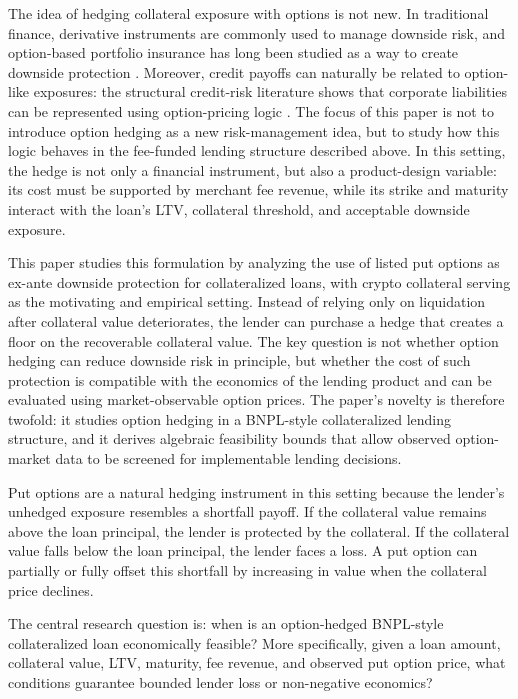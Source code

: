\documentclass[11pt]{article}
\begin{document}
The idea of hedging collateral exposure with options is not new. In traditional finance, derivative instruments are commonly used to manage downside risk, and option-based portfolio insurance has long been studied as a way to create downside protection \citep{rubinstein_1985_portfolio_insurance, lien_tse_2001_downside}. Moreover, credit payoffs can naturally be related to option-like exposures: the structural credit-risk literature shows that corporate liabilities can be represented using option-pricing logic \citep{black_scholes_1973_options, merton_1974_debt}. The focus of this paper is not to introduce option hedging as a new risk-management idea, but to study how this logic behaves in the fee-funded lending structure described above. In this setting, the hedge is not only a financial instrument, but also a product-design variable: its cost must be supported by merchant fee revenue, while its strike and maturity interact with the loan’s LTV, collateral threshold, and acceptable downside exposure.

This paper studies this formulation by analyzing the use of listed put options as ex-ante downside protection for collateralized loans, with crypto collateral serving as the motivating and empirical setting. Instead of relying only on liquidation after collateral value deteriorates, the lender can purchase a hedge that creates a floor on the recoverable collateral value. The key question is not whether option hedging can reduce downside risk in principle, but whether the cost of such protection is compatible with the economics of the lending product and can be evaluated using market-observable option prices. The paper’s novelty is therefore twofold: it studies option hedging in a BNPL-style collateralized lending structure, and it derives algebraic feasibility bounds that allow observed option-market data to be screened for implementable lending decisions.

Put options are a natural hedging instrument in this setting because the lender’s unhedged exposure resembles a shortfall payoff. If the collateral value remains above the loan principal, the lender is protected by the collateral. If the collateral value falls below the loan principal, the lender faces a loss. A put option can partially or fully offset this shortfall by increasing in value when the collateral price declines.

The central research question is: when is an option-hedged BNPL-style collateralized loan economically feasible? More specifically, given a loan amount, collateral value, LTV, maturity, fee revenue, and observed put option price, what conditions guarantee bounded lender loss or non-negative economics?
\end{document}
